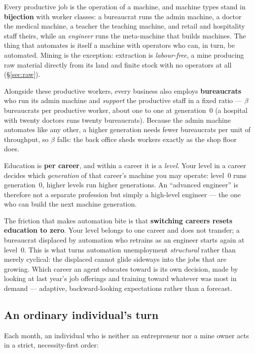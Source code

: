 \documentclass[11pt]{article}
\begin{document}
Every productive job is the operation of a machine, and machine types stand in
\textbf{bijection} with worker classes: a bureaucrat runs the admin machine, a
doctor the medical machine, a teacher the teaching machine, and retail and
hospitality staff theirs, while an \emph{engineer} runs the meta-machine that
builds machines. The thing that automates is itself a machine with operators who
can, in turn, be automated. Mining is the exception: extraction is
\emph{labour-free}, a mine producing raw material directly from its land and
finite stock with no operators at all (\S\ref{sec:raw}).

Alongside these productive workers, every business also employs
\textbf{bureaucrats} who run its admin machine and \emph{support} the productive
staff in a fixed ratio --- $\beta$ bureaucrats per productive worker, about one
to one at generation~0 (a hospital with twenty doctors runs twenty bureaucrats).
Because the admin machine automates like any other, a higher
generation needs fewer bureaucrats per unit of throughput, so $\beta$ falls: the
back office sheds workers exactly as the shop floor does.

Education is \textbf{per career}, and within a career it is a \emph{level}. Your
level in a career decides which \emph{generation} of that career's machine you
may operate: level~0 runs generation~0, higher levels run higher generations.
An ``advanced engineer'' is therefore not a separate profession but simply a
high-level engineer --- the one who can build the next machine generation.

The friction that makes automation bite is that \textbf{switching careers resets
education to zero}. Your level belongs to one career and does not transfer; a
bureaucrat displaced by automation who retrains as an engineer starts again at
level~0. This is what turns automation unemployment \emph{structural} rather
than merely cyclical: the displaced cannot glide sideways into the jobs that are
growing. Which career an agent educates toward is its own decision, made by
looking at last year's job offerings and training toward whatever was most in
demand --- adaptive, backward-looking expectations rather than a forecast.

\subsection{An ordinary individual's turn}
\label{sec:individual-turn}

Each month, an individual who is neither an entrepreneur nor a mine owner acts
in a strict, necessity-first order:
\end{document}
